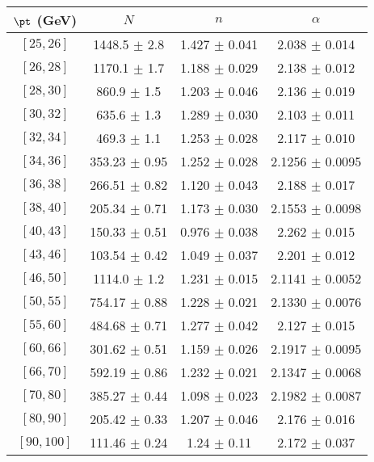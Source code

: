 \begin{tabular}{c||c|c|c}
$\pt$ (GeV) & $N$ & $n$ & $\alpha$ \\
\hline
$[25, 26]$ & 1448.5 $\pm$ 2.8 & 1.427 $\pm$ 0.041 & 2.038 $\pm$ 0.014\\
$[26, 28]$ & 1170.1 $\pm$ 1.7 & 1.188 $\pm$ 0.029 & 2.138 $\pm$ 0.012\\
$[28, 30]$ & 860.9 $\pm$ 1.5 & 1.203 $\pm$ 0.046 & 2.136 $\pm$ 0.019\\
$[30, 32]$ & 635.6 $\pm$ 1.3 & 1.289 $\pm$ 0.030 & 2.103 $\pm$ 0.011\\
$[32, 34]$ & 469.3 $\pm$ 1.1 & 1.253 $\pm$ 0.028 & 2.117 $\pm$ 0.010\\
$[34, 36]$ & 353.23 $\pm$ 0.95 & 1.252 $\pm$ 0.028 & 2.1256 $\pm$ 0.0095\\
$[36, 38]$ & 266.51 $\pm$ 0.82 & 1.120 $\pm$ 0.043 & 2.188 $\pm$ 0.017\\
$[38, 40]$ & 205.34 $\pm$ 0.71 & 1.173 $\pm$ 0.030 & 2.1553 $\pm$ 0.0098\\
$[40, 43]$ & 150.33 $\pm$ 0.51 & 0.976 $\pm$ 0.038 & 2.262 $\pm$ 0.015\\
$[43, 46]$ & 103.54 $\pm$ 0.42 & 1.049 $\pm$ 0.037 & 2.201 $\pm$ 0.012\\
$[46, 50]$ & 1114.0 $\pm$ 1.2 & 1.231 $\pm$ 0.015 & 2.1141 $\pm$ 0.0052\\
$[50, 55]$ & 754.17 $\pm$ 0.88 & 1.228 $\pm$ 0.021 & 2.1330 $\pm$ 0.0076\\
$[55, 60]$ & 484.68 $\pm$ 0.71 & 1.277 $\pm$ 0.042 & 2.127 $\pm$ 0.015\\
$[60, 66]$ & 301.62 $\pm$ 0.51 & 1.159 $\pm$ 0.026 & 2.1917 $\pm$ 0.0095\\
$[66, 70]$ & 592.19 $\pm$ 0.86 & 1.232 $\pm$ 0.021 & 2.1347 $\pm$ 0.0068\\
$[70, 80]$ & 385.27 $\pm$ 0.44 & 1.098 $\pm$ 0.023 & 2.1982 $\pm$ 0.0087\\
$[80, 90]$ & 205.42 $\pm$ 0.33 & 1.207 $\pm$ 0.046 & 2.176 $\pm$ 0.016\\
$[90, 100]$ & 111.46 $\pm$ 0.24 & 1.24 $\pm$ 0.11 & 2.172 $\pm$ 0.037\\
\end{tabular}
